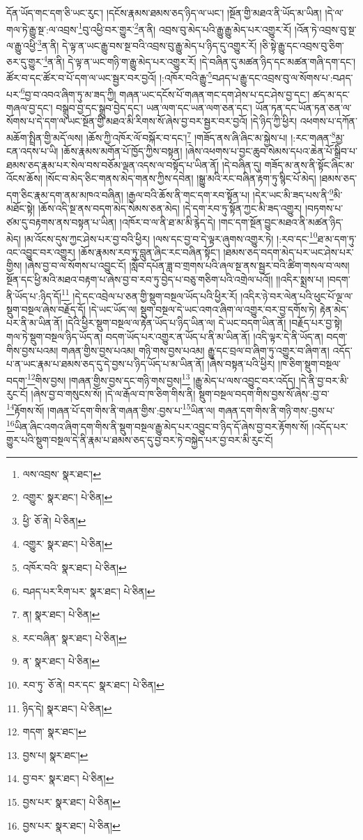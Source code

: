 དོན་ཡོད་གང་དག་ཅི་ཡང་རུང་། །དངོས་རྣམས་ཐམས་ཅད་ཉིད་ལ་ཡང་། །སྔོན་གྱི་མཐའ་ནི་ཡོད་མ་ཡིན། །དེ་ལ་གལ་ཏེ་རྒྱུ་སྔ་:ལ་འབྲས་\footnote{ལས་འབྲས་  སྣར་ཐང་། }བུ་འཕྱི་བར་གྱུར་\footnote{འགྱུར་  སྣར་ཐང་།  པེ་ཅིན། }ན་ནི། འབྲས་བུ་མེད་པའི་རྒྱུ་རྒྱུ་མེད་པར་འགྱུར་རོ། །འོན་ཏེ་འབྲས་བུ་སྔ་ལ་རྒྱུ་འཕྱི་\footnote{ཕྱི་  ཅོ་ནེ།  པེ་ཅིན། }ན་ནི། དེ་ལྟ་ན་ཡང་རྒྱུ་བས་སྔ་བའི་འབྲས་བུ་རྒྱུ་མེད་པ་ཉིད་དུ་འགྱུར་རོ། །ཅི་སྟེ་རྒྱུ་དང་འབྲས་བུ་ཅིག་ཅར་དུ་གྱུར་\footnote{འགྱུར་  སྣར་ཐང་།  པེ་ཅིན། }ན་ནི། དེ་ལྟ་ན་ཡང་གཉི་ག་རྒྱུ་མེད་པར་འགྱུར་རོ། །དེ་བཞིན་དུ་མཚན་ཉིད་དང་མཚན་གཞི་དག་དང་། ཚོར་བ་དང་ཚོར་བ་པོ་དག་ལ་ཡང་སྦྱར་བར་བྱའོ། །:འཁོར་བའི་རྒྱུ་\footnote{འཁོར་བའི་  སྣར་ཐང་།  པེ་ཅིན། }བཤད་པ་རྒྱུ་དང་འབྲས་བུ་ལ་སོགས་པ་:བཤད་པར་\footnote{བཤད་པར་རིག་པར་  སྣར་ཐང་།  པེ་ཅིན། }བྱ་བ་འབའ་ཞིག་ཏུ་མ་ཟད་ཀྱི། གཞན་ཡང་དངོས་པོ་གཞན་གང་དག་ཤེས་པ་དང་ཤེས་བྱ་དང་། ཚད་མ་དང་གཞལ་བྱ་དང་། བསྒྲུབ་བྱ་དང་སྒྲུབ་བྱེད་དང་། ཡན་ལག་དང་ཡན་ལག་ཅན་དང་། ཡོན་ཏན་དང་ཡོན་ཏན་ཅན་ལ་སོགས་པ་དེ་དག་ལ་ཡང་སྔོན་གྱི་མཐའ་མི་རིགས་སོ་ཞེས་བྱ་བར་སྦྱར་བར་བྱའོ། །དེ་ཉིད་ཀྱི་ཕྱིར། འཕགས་པ་དཀོན་མཆོག་སྤྲིན་གྱི་མདོ་ལས། །ཆོས་ཀྱི་འཁོར་ལོ་བསྐོར་བ་དང་།\footnote{ན།  སྣར་ཐང་།  པེ་ཅིན། } །གཟོད་ནས་ཞི་ཞིང་མ་སྐྱེས་པ། །:རང་གཞན་\footnote{རང་བཞིན་  སྣར་ཐང་།  པེ་ཅིན། }མྱ་ངན་འདས་པ་ཡི། །ཆོས་རྣམས་མགོན་པོ་ཁྱོད་ཀྱིས་བསྟན། །ཞེས་འཕགས་པ་བྱང་ཆུབ་སེམས་དཔའ་ཆེན་པོ་སྒྲིབ་པ་ཐམས་ཅད་རྣམ་པར་སེལ་བས་བཅོམ་ལྡན་འདས་ལ་བསྟོད་པ་ཡིན་ནོ། །དེ་བཞིན་དུ། གཟོད་མ་ནས་ནི་སྟོང་ཞིང་མ་འོངས་ཆོས། །སོང་བ་མེད་ཅིང་གནས་མེད་གནས་ཀྱིས་དབེན། །སྒྱུ་མའི་རང་བཞིན་རྟག་ཏུ་སྙིང་པོ་མེད། །ཐམས་ཅད་དག་ཅིང་རྣམ་དག་ནམ་མཁའ་བཞིན། །རྒྱལ་བའི་ཆོས་ནི་གང་དག་རབ་སྟོན་པ། །དེར་ཡང་མི་ཟད་པས་ནི་\footnote{ན་  སྣར་ཐང་།  པེ་ཅིན། }མི་མཐོང་སྟེ། །ཆོས་འདི་སྔ་ནས་བདག་མེད་སེམས་ཅན་མེད། །དེ་དག་རབ་ཏུ་སྟོན་ཀྱང་མི་ཟད་འགྱུར། །བཏགས་པ་ཙམ་དུ་བརྟགས་ནས་བསྟན་པ་ཡིན། །འཁོར་བ་ལ་ནི་ཐ་མ་མི་རྙེད་དེ། །གང་དག་སྔོན་བྱུང་མཐའ་ནི་མཚན་ཉིད་མེད། །མ་འོངས་དུས་ཀྱང་ཤེས་པར་བྱ་བའི་ཕྱིར། །ལས་དང་བྱ་བ་དེ་ལྟར་ཞུགས་འགྱུར་ཏེ། །:རབ་དང་\footnote{རབ་ཏུ་  ཅོ་ནེ། བར་དང་  སྣར་ཐང་།  པེ་ཅིན། }ཐ་མ་དག་ཏུ་འང་འབྱུང་བར་འགྱུར། །ཆོས་རྣམས་རབ་ཏུ་བླུན་ཞིང་རང་བཞིན་སྟོང་། །ཐམས་ཅད་བདག་མེད་པར་ཡང་ཤེས་པར་གྱིས། །ཞེས་བྱ་བ་ལ་སོགས་པ་འབྱུང་ངོ། །སློབ་དཔོན་ཟླ་བ་གྲགས་པའི་ཞལ་སྔ་ནས་སྦྱར་བའི་ཚིག་གསལ་བ་ལས། སྔོན་དང་ཕྱི་མའི་མཐའ་བརྟག་པ་ཞེས་བྱ་བ་རབ་ཏུ་བྱེད་པ་བཅུ་གཅིག་པའི་འགྲེལ་པའོ།། །།འདིར་སྨྲས་པ། །བདག་ནི་ཡོད་པ་:ཉིད་དོ།\footnote{ཉིད་དེ།  སྣར་ཐང་།  པེ་ཅིན། } །དེ་དང་འབྲེལ་པ་ཅན་གྱི་སྡུག་བསྔལ་ཡོད་པའི་ཕྱིར་རོ། །འདིར་ཉེ་བར་ལེན་པའི་ཕུང་པོ་ལྔ་ལ་སྡུག་བསྔལ་ཞེས་བརྗོད་དོ། །དེ་ཡང་ཡོད་ལ། སྡུག་བསྔལ་དེ་ཡང་འགའ་ཞིག་ལ་འགྱུར་བར་བྱ་དགོས་ཏེ། རྟེན་མེད་པར་ནི་མ་ཡིན་ནོ། །དེའི་ཕྱིར་སྡུག་བསྔལ་ལ་རྟེན་ཡོད་པ་ཉིད་ཡིན་ལ། དེ་ཡང་བདག་ཡིན་ནོ། །བརྗོད་པར་བྱ་སྟེ། གལ་ཏེ་སྡུག་བསྔལ་ཉིད་ཡོད་ན། བདག་ཡོད་པར་འགྱུར་ན་ཡོད་པ་ནི་མ་ཡིན་ནོ། །འདི་ལྟར་དེ་ནི་ཡོད་ན། བདག་གིས་བྱས་པའམ། གཞན་གྱིས་བྱས་པའམ། གཉི་གས་བྱས་པའམ། རྒྱུ་དང་བྲལ་བ་ཞིག་ཏུ་འགྱུར་བ་ཞིག་ན། འདོད་པ་ན་ཡང་རྣམ་པ་ཐམས་ཅད་དུ་དེ་བྱས་པ་ཉིད་ཡོད་པ་མ་ཡིན་ནོ། །ཞེས་བསྟན་པའི་ཕྱིར། །ཁ་ཅིག་སྡུག་བསྔལ་བདག་\footnote{གདག་  སྣར་ཐང་། }གིས་བྱས། །གཞན་གྱིས་བྱས་དང་གཉི་གས་བྱས།\footnote{བྱས་པ།  སྣར་ཐང་། } །རྒྱུ་མེད་པ་ལས་འབྱུང་བར་འདོད། །དེ་ནི་བྱ་བར་མི་རུང་ངོ། །ཞེས་བྱ་བ་གསུངས་སོ། །དེ་ལ་རྒོལ་བ་ཁ་ཅིག་གིས་ནི། སྡུག་བསྔལ་བདག་གིས་བྱས་སོ་ཞེས་:བྱ་བ་\footnote{བྱ་བར་  སྣར་ཐང་།  པེ་ཅིན། }རྟོགས་སོ། །གཞན་པོ་དག་གིས་ནི་གཞན་གྱིས་:བྱས་པ་\footnote{བྱས་པར་  སྣར་ཐང་།  པེ་ཅིན། }ཡིན་ལ། གཞན་དག་གིས་ནི་གཉི་གས་:བྱས་པ་\footnote{བྱས་པར་  སྣར་ཐང་།  པེ་ཅིན། }ཡིན་ཞིང་འགའ་ཞིག་དག་གིས་ནི་སྡུག་བསྔལ་རྒྱུ་མེད་པར་འབྱུང་བ་ཉིད་དོ་ཞེས་བྱ་བར་རྟོགས་སོ། །འདོད་པར་གྱུར་པའི་སྡུག་བསྔལ་དེ་ནི་རྣམ་པ་ཐམས་ཅད་དུ་བྱ་བར་ཏེ་བསྐྱེད་པར་བྱ་བར་མི་རུང་ངོ། 